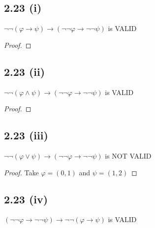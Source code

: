\documentclass[12pt]{article}
\begin{document}
\subsection*{2.23 (i)} 
$\neg \neg(\varphi \rightarrow \psi) \rightarrow (\neg \neg \varphi \rightarrow \neg \neg \psi)$ is VALID

\begin{proof}

\end{proof}

\subsection*{2.23 (ii)} 
$\neg \neg(\varphi \wedge \psi) \rightarrow (\neg \neg \varphi \rightarrow \neg \neg \psi)$ is VALID

\begin{proof}

\end{proof}

\subsection*{2.23 (iii)} 
$\neg \neg(\varphi \vee \psi) \rightarrow (\neg \neg \varphi \rightarrow \neg \neg \psi)$ is NOT VALID

\begin{proof}
Take $\varphi = (0,1)$ and $\psi = (1,2)$
\end{proof}

\subsection*{2.23 (iv)} 
$(\neg \neg \varphi \rightarrow \neg \neg \psi) \rightarrow \neg \neg (\varphi \rightarrow \psi)$ is VALID
\end{document}
